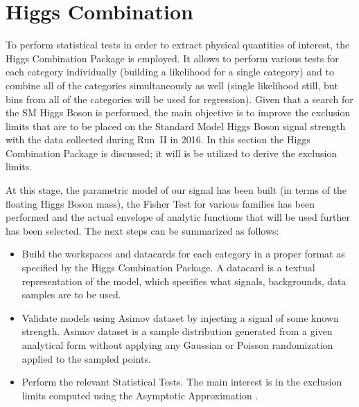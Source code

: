 \section{Higgs Combination} \label{section:higgs_combination}
To perform statistical tests in order to extract physical quantities of interest, the Higgs Combination Package \cite{CMSHiggsCombination} is employed. It allows to perform various tests for each category individually (building a likelihood for a single category) and to combine all of the categories simultaneously as well (single likelihood still, but bins from all of the categories will be used for regression). Given that a search for the SM Higgs Boson is performed, the main objective is to improve the exclusion limits that are to be placed on the Standard Model Higgs Boson signal strength with the data collected during Run~II in 2016. In this section the Higgs Combination Package is discussed; it will is be utilized to derive the exclusion limits.

At this stage, the parametric model of our signal has been built (in terms of the floating Higgs Boson mass), the Fisher Test for various families has been performed and the actual envelope of analytic functions that will be used further has been selected. The next steps can be summarized as follows:
\begin{itemize}
    \item Build the workspaces and datacards for each category in a proper format as specified by the Higgs Combination Package. A datacard is a textual representation of the model, which specifies what signals, backgrounds, data samples are to be used.
    \item Validate models using Asimov dataset by injecting a signal of some known strength. Asimov dataset is a sample distribution generated from a given analytical form without applying any Gaussian or Poisson randomization applied to the sampled points.
    \item Perform the relevant Statistical Tests. The main interest is in the exclusion limits computed using the Asymptotic Approximation \cite{Asymptotic}.
\end{itemize}


